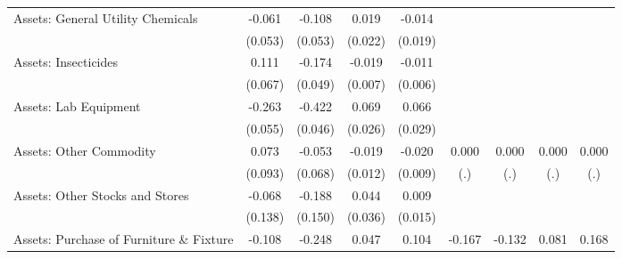 {\begin{longtable}{l*{8}{c}}
Assets: General Utility Chemicals&      -0.061         &      -0.108\sym{*}  &       0.019         &      -0.014         &                     &                     &                     &                     \\
                    &     (0.053)         &     (0.053)         &     (0.022)         &     (0.019)         &                     &                     &                     &                     \\
Assets: Insecticides&       0.111         &      -0.174\sym{***}&      -0.019\sym{**} &      -0.011         &                     &                     &                     &                     \\
                    &     (0.067)         &     (0.049)         &     (0.007)         &     (0.006)         &                     &                     &                     &                     \\
Assets: Lab Equipment&      -0.263\sym{***}&      -0.422\sym{***}&       0.069\sym{**} &       0.066\sym{*}  &                     &                     &                     &                     \\
                    &     (0.055)         &     (0.046)         &     (0.026)         &     (0.029)         &                     &                     &                     &                     \\
Assets: Other Commodity&       0.073         &      -0.053         &      -0.019         &      -0.020\sym{*}  &       0.000         &       0.000         &       0.000         &       0.000         \\
                    &     (0.093)         &     (0.068)         &     (0.012)         &     (0.009)         &         (.)         &         (.)         &         (.)         &         (.)         \\
Assets: Other Stocks and Stores&      -0.068         &      -0.188         &       0.044         &       0.009         &                     &                     &                     &                     \\
                    &     (0.138)         &     (0.150)         &     (0.036)         &     (0.015)         &                     &                     &                     &                     \\
Assets: Purchase of Furniture \& Fixture&      -0.108         &      -0.248\sym{***}&       0.047\sym{*}  &       0.104\sym{***}&      -0.167         &      -0.132         &       0.081\sym{***}&       0.168\sym{***}\\

\end{longtable}}
